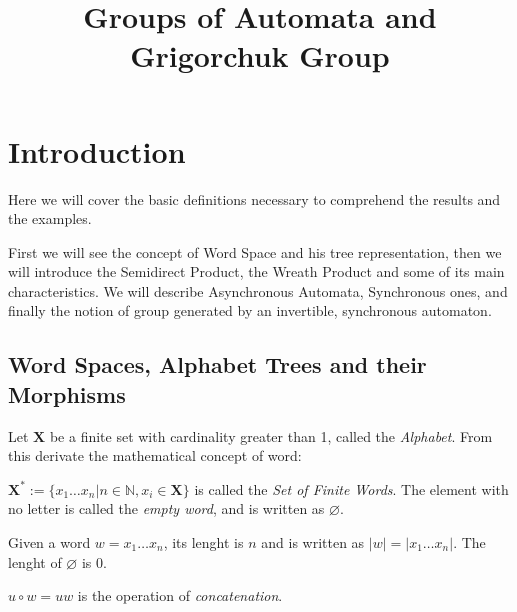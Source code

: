 \documentclass[mat1]{fmfdeloTS}
\title{Groups of Automata and Grigorchuk Group} %
\newcommand{\N}{\mathbb N}
\newcommand{\abece}{\mathbf X}
\newcommand{\fslovar}{\mathbf{X^*}}
\begin{document}



\tableofcontents
\section{Introduction}
Here we will cover the basic definitions necessary to comprehend the results and the examples.




First we will see the concept of Word Space and his tree representation, then we will introduce the Semidirect Product, the Wreath Product  and some of its main characteristics. We will describe Asynchronous Automata, Synchronous ones, and finally the notion of group generated by an invertible, synchronous automaton.

\subsection{Word Spaces, Alphabet Trees and their Morphisms}
Let $\abece$ be a finite set with cardinality greater than 1, called the \textit{Alphabet}. From this derivate the mathematical concept of word:

\begin{definition}
$\fslovar:=\{x_1\dots x_n|n\in\N, x_i\in\abece \}$ is called the \textit{Set of Finite Words}.  The element with no letter is called the \textit{empty word}, and is written as $\varnothing$.


Given a word $w=x_1\dots x_n$, its lenght is $n$ and is written as $|w|=|x_1\dots x_n|$. The lenght of $\varnothing$ is 0.


$u \circ w=uw$ is the operation of \textit{concatenation}.
\end{definition}
\end{document}
